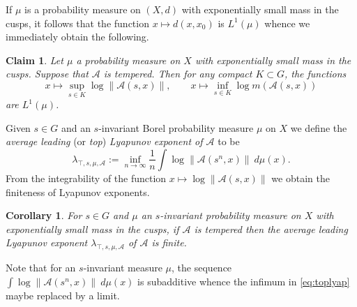 \documentclass[10pt,reqno]{amsart}
\theoremstyle{Theorem}
\newtheorem{claim}[theorem]{Claim}
\newtheorem{corollary}[theorem]{Corollary}
\theoremstyle{definition}
\theoremstyle{remark}
\newcommand{\inv}{^{-1}}
\def\calA{\mathcal A}
\begin{document}
%
%
If $\mu$ is a probability measure on $(X,d)$ with exponentially small mass in the cusps, it follows that the function  $x\mapsto d(x,x_0)$ %
is $L^1(\mu)$ whence  we immediately  obtain the following.  %
\begin{claim}\label{lem:foobar}
Let $\mu$ a probability  measure on $X$ with exponentially small mass in the cusps.   Suppose that $\calA$ is tempered.  Then for any compact $K\subset G$, the functions   $$x\mapsto  \sup_{s\in K} \log \left \| \calA(s, x)\right \| ,\quad \quad x\mapsto    \inf_{s\in K}\log m\left( \calA(s, x)\right)  $$ are $L^1(\mu)$.
\end{claim}
%
%
%
%


Given $s\in G$ and an $s$-invariant Borel probability measure $\mu$ on $X$ we define the \emph{average leading} (or \emph{top})  \emph{Lyapunov exponent of $\calA$} to be
\begin{equation} \label{eq:toplyap} \lambda_{\top,s,\mu, \calA} := \inf _{n\to \infty} \frac 1 n  \int \log \|\calA(s^n, x)\| \ d \mu (x).\end{equation}
From the   integrability of the function $x\mapsto  \log \|\calA(s, x)\|  $   we obtain   the finiteness of Lyapunov exponents.
\begin{corollary}
\label{corollary:finite}
For $s\in G$ and   $\mu$   an $s$-invariant probability measure on $X$ with exponentially small mass in the cusps, if  $\calA$ is tempered
then the average leading   Lyapunov exponent $\lambda_{\top,s,\mu, \calA}$ of $\calA$ is finite.
\end{corollary}
Note that for an $s$-invariant measure $\mu$,  the sequence  $  \int \log \|\calA(s^n, x)\| \ d \mu (x)$ is subadditive whence the infimum in \eqref{eq:toplyap} maybe replaced by a limit.
\end{document}
